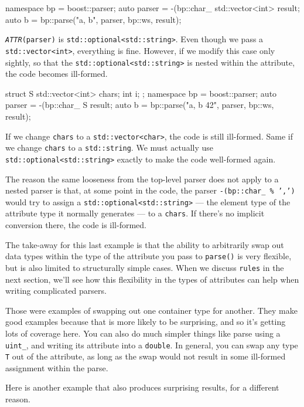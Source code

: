 \begin{code}
namespace bp = boost::parser;
auto parser = -(bp::char_ %
std::vector<int> result;
auto b = bp::parse("a, b", parser, bp::ws, result);
\end{code}

\emph{\texttt{ATTR}}\texttt{(parser)} is \texttt{std::optional<std::string>}. Even though we pass a \texttt{std::vector<int>}, everything is fine. However, if we modify this case only sightly, so that the \texttt{std::optional<std::string>} is nested within the attribute, the code becomes ill-formed.

\begin{code}
struct S
{
    std::vector<int> chars;
    int i;
};
namespace bp = boost::parser;
auto parser = -(bp::char_ %
S result;
auto b = bp::parse("a, b 42", parser, bp::ws, result);
\end{code}

If we change \texttt{chars} to a \texttt{std::vector<char>}, the code is still ill-formed. Same if we change \texttt{chars} to a \texttt{std::string}. We must actually use \texttt{std::optional<std::string>} exactly to make the code well-formed again.

The reason the same looseness from the top-level parser does not apply to a nested parser is that, at some point in the code, the parser \texttt{-(bp::char\_ \% ',')} would try to assign a \texttt{std::optional<std::string>} --- the element type of the attribute type it normally generates --- to a \texttt{chars}. If there's no implicit conversion there, the code is ill-formed.

The take-away for this last example is that the ability to arbitrarily swap out data types within the type of the attribute you pass to \texttt{parse()} is very flexible, but is also limited to structurally simple cases. When we discuss \texttt{rules} in the next section, we'll see how this flexibility in the types of attributes can help when writing complicated parsers.

Those were examples of swapping out one container type for another. They make good examples because that is more likely to be surprising, and so it's getting lots of coverage here. You can also do much simpler things like parse using a \texttt{uint\_}, and writing its attribute into a \texttt{double}. In general, you can swap any type \texttt{T} out of the attribute, as long as the swap would not result in some ill-formed assignment within the parse.

Here is another example that also produces surprising results, for a different reason.

